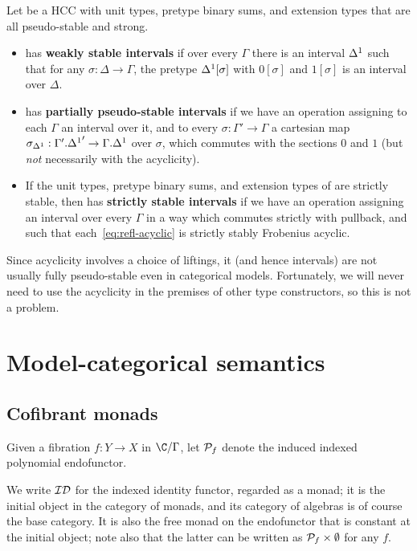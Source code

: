 \documentclass{amsart}
\begin{document}
\begin{defn}
  Let \E be a HCC with unit types, pretype binary sums, and extension types that are all pseudo-stable and strong.
  \begin{itemize}
  \item \E has \textbf{weakly stable intervals} if over every $\Gamma$ there is an interval ${\Delta^1}$ such that for any $\sigma:\Delta\to\Gamma$, the pretype ${\Delta^1}[\sigma]$ with $0[\sigma]$ and $1[\sigma]$ is an interval over $\Delta$.
  \item \E has \textbf{partially pseudo-stable intervals} if we have an operation assigning to each $\Gamma$ an interval over it, and to every $\sigma:\Gamma'\to\Gamma$ a cartesian map $\sigma_{\Delta^1} : \Gamma'.{\Delta^1}' \to \Gamma.{\Delta^1}$ over $\sigma$, which commutes with the sections $0$ and $1$ (but \emph{not} necessarily with the acyclicity).
  \item If the unit types, pretype binary sums, and extension types of \E are strictly stable, then \E has \textbf{strictly stable intervals} if we have an operation assigning an interval over every $\Gamma$ in a way which commutes strictly with pullback, and such that each~\eqref{eq:refl-acyclic} is strictly stably Frobenius acyclic.
  \end{itemize}
\end{defn}

Since acyclicity involves a choice of liftings, it (and hence intervals) are not usually fully pseudo-stable even in categorical models.
Fortunately, we will never need to use the acyclicity in the premises of other type constructors, so this is not a problem.


\section{Model-categorical semantics}
\label{sec:model-categories}

\subsection{Cofibrant monads}
\label{sec:cofibrant-monads}

Given a fibration $f:Y\to X$ in $\C/\Gamma$, let $\mathcal{P}_{f}$ denote the induced indexed polynomial endofunctor.

We write $\mathcal{ID}$ for the indexed identity functor, regarded as a monad; it is the initial object in the category of monads, and its category of algebras is of course the base category.
It is also the free monad on the endofunctor that is constant at the initial object; note also that the latter can be written as $\mathcal{P}_{f} \times \emptyset$ for any $f$.
\end{document}
